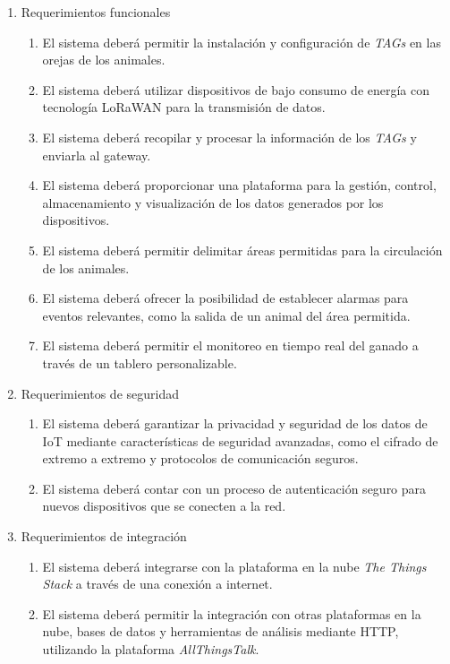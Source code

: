 \documentclass[
11pt, %
]{charter}
\begin{document}
\begin{enumerate}
	\item Requerimientos funcionales
		\begin{enumerate}
			\item El sistema deberá permitir la instalación y configuración de \emph{TAGs} en las orejas de los animales.
			\item El sistema deberá utilizar dispositivos de bajo consumo de energía con tecnología LoRaWAN para la transmisión de datos.
			\item El sistema deberá recopilar y procesar la información de los \emph{TAGs} y enviarla al gateway.
			\item El sistema deberá proporcionar una plataforma para la gestión, control, almacenamiento y visualización de los datos generados por los dispositivos.
			\item El sistema deberá permitir delimitar áreas permitidas para la circulación de los animales.
			\item El sistema deberá ofrecer la posibilidad de establecer alarmas para eventos relevantes, como la salida de un animal del área permitida.
			\item El sistema deberá permitir el monitoreo en tiempo real del ganado a través de un tablero personalizable.
		\end{enumerate}
	\item Requerimientos de seguridad
		\begin{enumerate}
			\item El sistema deberá garantizar la privacidad y seguridad de los datos de IoT mediante características de seguridad avanzadas, como el cifrado de extremo a extremo y protocolos de comunicación seguros.
			\item El sistema deberá contar con un proceso de autenticación seguro para nuevos dispositivos que se conecten a la red.
		\end{enumerate}
		
	\item Requerimientos de integración
		\begin{enumerate}
			\item El sistema deberá integrarse con la plataforma en la nube \emph{The Things Stack} a través de una conexión a internet.
			\item El sistema deberá permitir la integración con otras plataformas en la nube, bases de datos y herramientas de análisis mediante HTTP, utilizando la plataforma \emph{AllThingsTalk}.
		\end{enumerate}
		

\end{enumerate}
\end{document}
